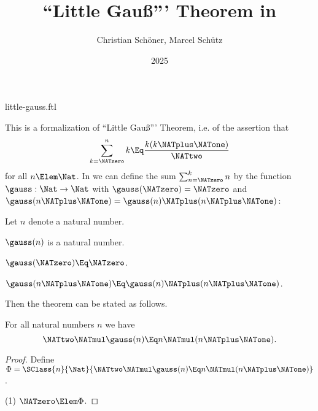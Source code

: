 \documentclass{stex}
\title{``Little Gauß''' Theorem in \Naproche}
\author{Christian Schöner, Marcel Schütz}
\date{2025}
\begin{document}
\begin{smodule}{little-gauss.ftl}
\maketitle



\noindent This is a formalization of ``Little Gauß''' Theorem, i.e. of
the assertion that
\[\sum_{k = \NATzero}^n k \Eq \frac{k(k \NATplus \NATone)}\NATtwo\]
for all $n \Elem \Nat$.
In \Naproche we can define the sum $\sum_{n = \NATzero}^k n$ by the function
$\gauss : \Nat \to \Nat$ with $\gauss(\NATzero) = \NATzero$ and
$\gauss(n \NATplus \NATone) = \gauss(n) \NATplus (n \NATplus \NATone)$:

\begin{forthel}
  Let $n$ denote a natural number.

  \begin{signature*}[for=gauss]
    $\gauss(n)$ is a natural number.
  \end{signature*}

  \begin{axiom*}
    $\gauss(\NATzero) \Eq \NATzero$.
  \end{axiom*}

  \begin{axiom*}
    $\gauss(n \NATplus \NATone) \Eq \gauss(n) \NATplus (n \NATplus \NATone)$.
  \end{axiom*}
\end{forthel}

\noindent Then the theorem can be stated as follows.

\begin{forthel}
  \begin{theorem*}[title=Little Gauß,name=Little Gauss]
    For all natural numbers $n$ we have
    \[\NATtwo \NATmul \gauss(n) \Eq n \NATmul (n \NATplus \NATone).\]
  \end{theorem*}
  \begin{proof}
    Define $\Phi = \SClass{n}{\Nat}{\NATtwo \NATmul \gauss(n) \Eq n \NATmul (n \NATplus \NATone)}$.
    
    (1) $\NATzero \Elem \Phi$.


\end{proof}
\end{forthel}
\end{smodule}
\end{document}
